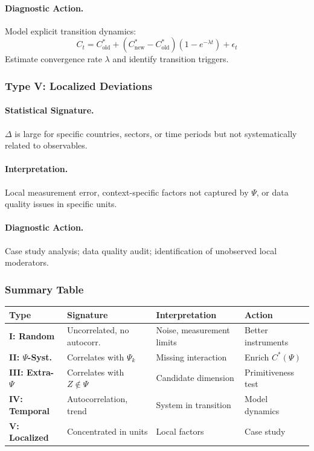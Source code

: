 \paragraph{Diagnostic Action.}
Model explicit transition dynamics:
\begin{equation}
C_t = C^*_{\text{old}} + (C^*_{\text{new}} - C^*_{\text{old}})(1 - e^{-\lambda t}) + \epsilon_t
\end{equation}
Estimate convergence rate $\lambda$ and identify transition triggers.

\subsubsection{Type V: Localized Deviations}

\paragraph{Statistical Signature.}
$\Delta$ is large for specific countries, sectors, or time periods but 
not systematically related to observables.

\paragraph{Interpretation.}
Local measurement error, context-specific factors not captured by $\Psi$, 
or data quality issues in specific units.

\paragraph{Diagnostic Action.}
Case study analysis; data quality audit; identification of unobserved 
local moderators.

\subsubsection{Summary Table}

\begin{center}
\renewcommand{\arraystretch}{1.4}
\small
\begin{tabular}{|p{1.8cm}|p{3.2cm}|p{3.5cm}|p{4cm}|}
\hline
\textbf{Type} & \textbf{Signature} & \textbf{Interpretation} & \textbf{Action} \\
\hline
\textbf{I: Random} & Uncorrelated, no autocorr. & Noise, measurement limits & Better instruments \\
\hline
\textbf{II: $\Psi$-Syst.} & Correlates with $\Psi_k$ & Missing interaction & Enrich $C^*(\Psi)$ \\
\hline
\textbf{III: Extra-$\Psi$} & Correlates with $Z \notin \Psi$ & Candidate dimension & Primitiveness test \\
\hline
\textbf{IV: Temporal} & Autocorrelation, trend & System in transition & Model dynamics \\
\hline
\textbf{V: Localized} & Concentrated in units & Local factors & Case study \\
\hline
\end{tabular}
\end{center}

